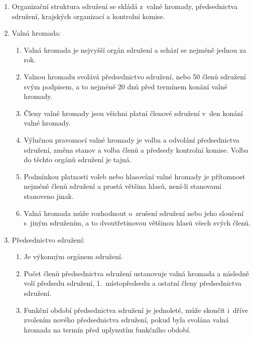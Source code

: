 \documentclass[a4paper]{article}
\begin{document}
    \begin{enumerate}
    \item Organizační struktura sdružení se skládá z~valné hromady,
        předsednictva sdružení, krajských organizací a kontrolní komise.

    \item Valná hromada:
        \begin{enumerate}
        \item Valná hromada je nejvyšší orgán sdružení a schází se nejméně
            jednou za rok.

        \item Valnou hromadu svolává předsednictvo sdružení, nebo 50 členů
            sdružení svým podpisem, a to nejméně 20 dnů před termínem konání
            valné hromady.

        \item Členy valné hromady jsou všichni platní členové sdružení v~den
            konání valné hromady.

        \item Výlučnou pravomocí valné hromady je volba a odvolání
            předsednictva sdružení, změna stanov a volba členů a předsedy
            kontrolní komise. Volba do těchto orgánů sdružení je tajná.

        \item Podmínkou platnosti voleb nebo hlasování valné hromady je
            přítomnost nejméně  členů sdružení a prostá většina
            hlasů, není-li stanovami stanoveno jinak.

        \item Valná hromada může rozhodnout o~zrušení sdružení nebo jeho
            sloučení s~jiným sdružením, a to dvoutřetinovou většinou hlasů
            všech svých členů.
        \end{enumerate}

    \item Předsednictvo sdružení:
        \begin{enumerate}
        \item Je výkonným orgánem sdružení.

        \item Počet členů předsednictva sdružení ustanovuje valná hromada a
            následně volí předsedu sdružení, 1.~místopředsedu a ostatní členy
            předsednictva sdružení.

        \item Funkční období předsednictva sdružení je jednoleté, může skončit
            i~dříve zvolením nového předsednictva sdružení, pokud byla svolána
            valná hromada na termín před uplynutím funkčního období.


\end{enumerate}
\end{enumerate}
\end{document}
